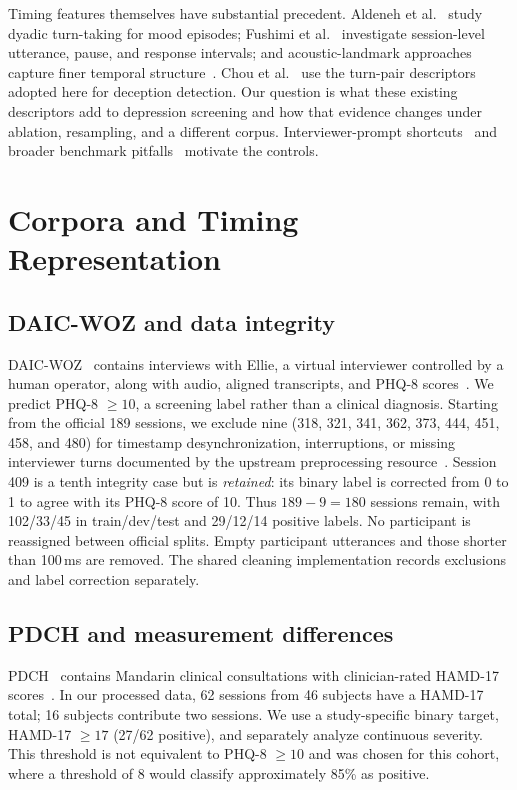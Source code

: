 \documentclass{article}
\begin{document}
Timing features themselves have substantial precedent. Aldeneh et al.~\cite{aldeneh2019mood} study dyadic turn-taking for mood episodes; Fushimi et al.~\cite{fushimi2026beyond} investigate session-level utterance, pause, and response intervals; and acoustic-landmark approaches capture finer temporal structure~\cite{huang2020landmark,zhang2024llms,zhang2025speechtrag}. Chou et al.~\cite{chou2019joint,chou2021automatic} use the turn-pair descriptors adopted here for deception detection. Our question is what these existing descriptors add to depression screening and how that evidence changes under ablation, resampling, and a different corpus. Interviewer-prompt shortcuts~\cite{burdisso2024prompts} and broader benchmark pitfalls~\cite{danylenko2026pitfalls} motivate the controls.

\section{Corpora and Timing Representation}
\label{sec:data}
\subsection{DAIC-WOZ and data integrity}
DAIC-WOZ~\cite{gratch2014daic} contains interviews with Ellie, a virtual interviewer controlled by a human operator, along with audio, aligned transcripts, and PHQ-8 scores~\cite{kroenke2009phq8}. We predict PHQ-8 $\geq10$, a screening label rather than a clinical diagnosis. Starting from the official 189 sessions, we exclude nine (318, 321, 341, 362, 373, 444, 451, 458, and 480) for timestamp desynchronization, interruptions, or missing interviewer turns documented by the upstream preprocessing resource~\cite{baileyDaicProcessing}. Session 409 is a tenth integrity case but is \emph{retained}: its binary label is corrected from 0 to 1 to agree with its PHQ-8 score of 10. Thus $189-9=180$ sessions remain, with 102/33/45 in train/dev/test and 29/12/14 positive labels. No participant is reassigned between official splits. Empty participant utterances and those shorter than 100\,ms are removed. The shared cleaning implementation records exclusions and label correction separately.

\subsection{PDCH and measurement differences}
PDCH~\cite{cao2025pdch} contains Mandarin clinical consultations with clinician-rated HAMD-17 scores~\cite{hamilton1960rating}. In our processed data, 62 sessions from 46 subjects have a HAMD-17 total; 16 subjects contribute two sessions. We use a study-specific binary target, HAMD-17 $\geq17$ (27/62 positive), and separately analyze continuous severity. This threshold is not equivalent to PHQ-8 $\geq10$ and was chosen for this cohort, where a threshold of 8 would classify approximately 85\% as positive.
\end{document}
